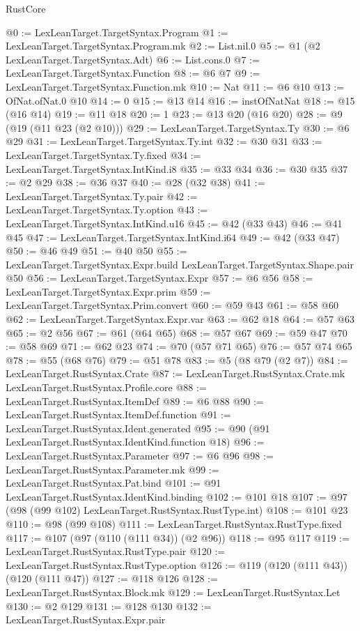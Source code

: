 \begin{lexlean}{RustCore}
\begin{coremodule}
@0 := LexLeanTarget.TargetSyntax.Program
@1 := LexLeanTarget.TargetSyntax.Program.mk
@2 := List.nil.{0}
@5 := @1 (@2 LexLeanTarget.TargetSyntax.Adt)
@6 := List.cons.{0}
@7 := LexLeanTarget.TargetSyntax.Function
@8 := @6 @7
@9 := LexLeanTarget.TargetSyntax.Function.mk
@10 := Nat
@11 := @6 @10
@13 := OfNat.ofNat.{0} @10
@14 := 0
@15 := @13 @14
@16 := instOfNatNat
@18 := @15 (@16 @14)
@19 := @11 @18
@20 := 1
@23 := @13 @20 (@16 @20)
@28 := @9 (@19 (@11 @23 (@2 @10)))
@29 := LexLeanTarget.TargetSyntax.Ty
@30 := @6 @29
@31 := LexLeanTarget.TargetSyntax.Ty.int
@32 := @30 @31
@33 := LexLeanTarget.TargetSyntax.Ty.fixed
@34 := LexLeanTarget.TargetSyntax.IntKind.i8
@35 := @33 @34
@36 := @30 @35
@37 := @2 @29
@38 := @36 @37
@40 := @28 (@32 @38)
@41 := LexLeanTarget.TargetSyntax.Ty.pair
@42 := LexLeanTarget.TargetSyntax.Ty.option
@43 := LexLeanTarget.TargetSyntax.IntKind.u16
@45 := @42 (@33 @43)
@46 := @41 @45
@47 := LexLeanTarget.TargetSyntax.IntKind.i64
@49 := @42 (@33 @47)
@50 := @46 @49
@51 := @40 @50
@55 := LexLeanTarget.TargetSyntax.Expr.build LexLeanTarget.TargetSyntax.Shape.pair @50
@56 := LexLeanTarget.TargetSyntax.Expr
@57 := @6 @56
@58 := LexLeanTarget.TargetSyntax.Expr.prim
@59 := LexLeanTarget.TargetSyntax.Prim.convert
@60 := @59 @43
@61 := @58 @60
@62 := LexLeanTarget.TargetSyntax.Expr.var
@63 := @62 @18
@64 := @57 @63
@65 := @2 @56
@67 := @61 (@64 @65)
@68 := @57 @67
@69 := @59 @47
@70 := @58 @69
@71 := @62 @23
@74 := @70 (@57 @71 @65)
@76 := @57 @74 @65
@78 := @55 (@68 @76)
@79 := @51 @78
@83 := @5 (@8 @79 (@2 @7))
@84 := LexLeanTarget.RustSyntax.Crate
@87 := LexLeanTarget.RustSyntax.Crate.mk LexLeanTarget.RustSyntax.Profile.core
@88 := LexLeanTarget.RustSyntax.ItemDef
@89 := @6 @88
@90 := LexLeanTarget.RustSyntax.ItemDef.function
@91 := LexLeanTarget.RustSyntax.Ident.generated
@95 := @90 (@91 LexLeanTarget.RustSyntax.IdentKind.function @18)
@96 := LexLeanTarget.RustSyntax.Parameter
@97 := @6 @96
@98 := LexLeanTarget.RustSyntax.Parameter.mk
@99 := LexLeanTarget.RustSyntax.Pat.bind
@101 := @91 LexLeanTarget.RustSyntax.IdentKind.binding
@102 := @101 @18
@107 := @97 (@98 (@99 @102) LexLeanTarget.RustSyntax.RustType.int)
@108 := @101 @23
@110 := @98 (@99 @108)
@111 := LexLeanTarget.RustSyntax.RustType.fixed
@117 := @107 (@97 (@110 (@111 @34)) (@2 @96))
@118 := @95 @117
@119 := LexLeanTarget.RustSyntax.RustType.pair
@120 := LexLeanTarget.RustSyntax.RustType.option
@126 := @119 (@120 (@111 @43)) (@120 (@111 @47))
@127 := @118 @126
@128 := LexLeanTarget.RustSyntax.Block.mk
@129 := LexLeanTarget.RustSyntax.Let
@130 := @2 @129
@131 := @128 @130
@132 := LexLeanTarget.RustSyntax.Expr.pair

\end{coremodule}
\end{lexlean}
